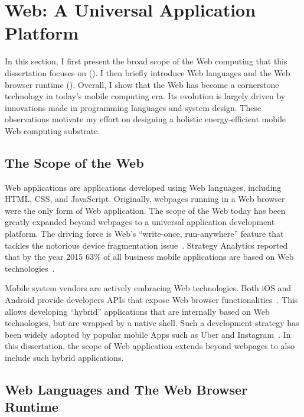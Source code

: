 
\chapter{Web: A Universal Application Platform}
\label{sec:background}

In this section, I first present the broad scope of the Web computing that this dissertation focuses on (). I then briefly introduce Web languages and the Web browser runtime (). Overall, I show that the Web has become a cornerstone technology in today's mobile computing era. Its evolution is largely driven by innovations made in programming languages and system design. These observations motivate my effort on designing a holistic energy-efficient mobile Web computing substrate.

\section{The Scope of the Web}
\label{sec:background:scope}

Web applications are applications developed using Web languages, including HTML, CSS, and JavaScript. Originally, webpages running in a Web browser were the only form of Web application. The scope of the Web today has been greatly expanded beyond webpages to a universal application development platform. The driving force is Web's ``write-once, run-anywhere'' feature that tackles the notorious device fragmentation issue~\cite{fragmentation}. Strategy Analytics reported that by the year 2015 63\% of all business mobile applications are based on Web technologies~\cite{html5rise}.

Mobile system vendors are actively embracing Web technologies. Both iOS and Android provide developers APIs that expose Web browser functionalities~\cite{uiwebview, webview}. This allows developing ``hybrid'' applications that are internally based on Web technologies, but are wrapped by a native shell. Such a development strategy has been widely adopted by popular mobile Apps such as Uber and Instagram~\cite{hybridapp}. In this dissertation, the scope of Web application extends beyond webpages to also include such hybrid applications.

\section{Web Languages and The Web Browser Runtime}
\label{sec:background:browser}


